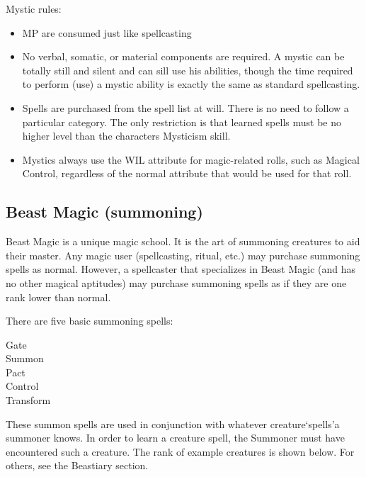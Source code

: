 \documentclass[twoside]{book}
\begin{document}
    {  
    Mystic rules:
    }
  
\begin{itemize}
      
  \item MP are consumed just like spellcasting
  \item No verbal, somatic, or material components are required. A mystic can be totally still and silent and can sill use his abilities, though the time required to perform (use) a mystic ability is exactly the same as standard spellcasting.
  \item Spells are purchased from the spell list at will. There is no need to follow a particular category. The only restriction is that learned spells must be no higher level than the characters Mysticism skill.
  \item Mystics always use the WIL attribute for magic-related rolls, such as Magical Control, regardless of the normal attribute that would be used for that roll.
\end{itemize}
  
    

\subsection{Beast Magic (summoning)}
    
    {  
    Beast Magic is a unique magic school. It is the art of summoning creatures to aid their master. Any magic user (spellcasting, ritual, etc.) may purchase summoning spells as normal. However, a spellcaster that specializes in Beast Magic (and has no other magical aptitudes) may purchase summoning spells as if they are one rank lower than normal.
    }
  
    {  
    There are five basic summoning spells:
    }
  
\begin{description}
    
  \item[Gate] 
  \item[Summon] 
  \item[Pact] 
  \item[Control] 
  \item[Transform] 
\end{description}
  
    {  
    These summon spells are used in conjunction with whatever creature`spells'a summoner knows. In order to learn a creature spell, the Summoner must have encountered such a creature. The rank of example creatures is shown below. For others, see the Beastiary section.
    }
  
\end{document}
